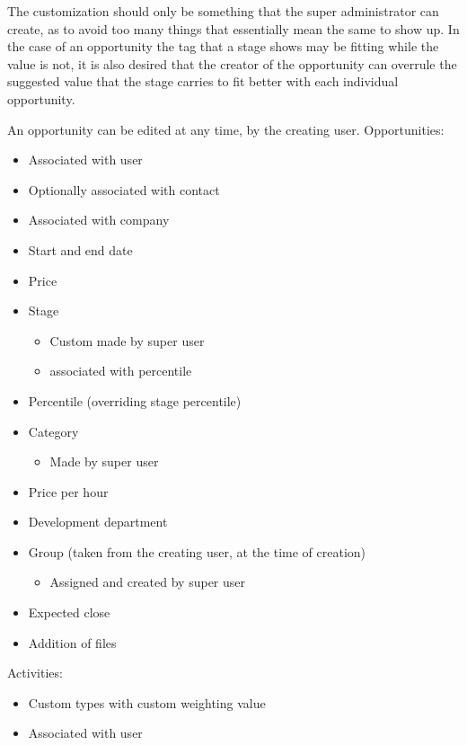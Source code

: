 The customization should only be something that the super administrator can create, as to avoid too many things that essentially mean the same to show up. In the case of an opportunity the tag that a stage shows may be fitting while the value is not, it is also desired that the creator of the opportunity can overrule the suggested value that the stage carries to fit better with each individual opportunity.



An opportunity can be edited at any time, by the creating user.
Opportunities:
\begin{itemize}
  \item Associated with user
  \item Optionally associated with contact
  \item Associated with company
  \item Start and end date
  \item Price
  \item Stage
  \begin{itemize}
    \item Custom made by super user
    \item associated with percentile
  \end{itemize}
  \item Percentile (overriding stage percentile)
  \item Category
  \begin{itemize}
    \item Made by super user
  \end{itemize}
  \item Price per hour
  \item Development department
  \item Group (taken from the creating user, at the time of creation)
  \begin{itemize}
    \item Assigned and created by super user
  \end{itemize}
  \item Expected close
  \item Addition of files
\end{itemize}

Activities:
\begin{itemize}
  \item Custom types with custom weighting value
  \item Associated with user
\end{itemize}

